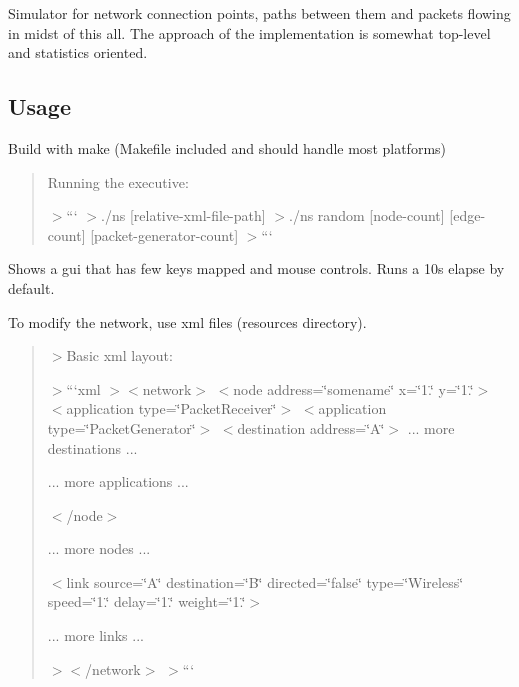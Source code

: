 Simulator for network connection points, paths between them and packets flowing in midst of this all. The approach of the implementation is somewhat top-\/level and statistics oriented. 



\subsection*{Usage}


\begin{DoxyItemize}
\item Build with make (Makefile included and should handle most platforms) \begin{quote}


Running the executive\+:

$>$``` $>$./ns \mbox{[}relative-\/xml-\/file-\/path\mbox{]} $>$./ns random \mbox{[}node-\/count\mbox{]} \mbox{[}edge-\/count\mbox{]} \mbox{[}packet-\/generator-\/count\mbox{]} $>$``` \end{quote}

\item Shows a gui that has few keys mapped and mouse controls. Runs a 10s elapse by default.
\item To modify the network, use xml files (resources directory). \begin{quote}


$>$Basic xml layout\+:

$>$```xml $>$$<$network$>$ $<$node address=\char`\"{}somename\char`\"{} x=\char`\"{}1.\char`\"{} y=\char`\"{}1.\char`\"{}$>$ $<$application type=\char`\"{}\+Packet\+Receiver\char`\"{}$>$ $<$application type=\char`\"{}\+Packet\+Generator\char`\"{}$>$ $<$destination address=\char`\"{}\+A\char`\"{}$>$ ... more destinations ...

... more applications ...

$<$/node$>$

... more nodes ...

$<$link source=\char`\"{}\+A\char`\"{} destination=\char`\"{}\+B\char`\"{} directed=\char`\"{}false\char`\"{} type=\char`\"{}\+Wireless\char`\"{} speed=\char`\"{}1.\char`\"{} delay=\char`\"{}1.\char`\"{} weight=\char`\"{}1.\char`\"{}$>$

... more links ...

$>$$<$/network$>$ $>$```

\end{quote}


\end{DoxyItemize}
